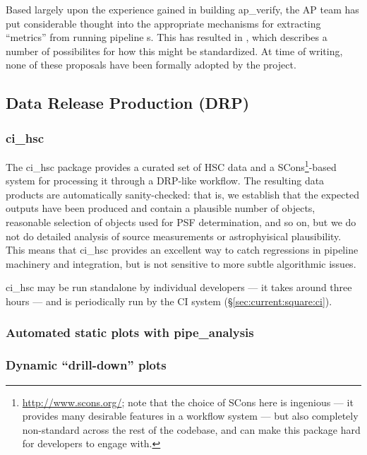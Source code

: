 \documentclass[DM,authoryear,toc,lsstdraft]{lsstdoc}
\begin{document}
Based largely upon the experience gained in building ap\_verify, the AP team
has put considerable thought into the appropriate mechanisms for extracting
``metrics'' from running pipeline s. This has resulted in
, which describes a number of possibilites for how this might
be standardized. At time of writing, none of these proposals have been
formally adopted by the project.

\subsection{Data Release Production (DRP)}
\label{sec:current:drp}

\subsubsection{ci\_hsc}
\label{sec:current:drp:cihsc}

The ci\_hsc package provides a curated set of HSC data and a
SCons\footnote{\url{http://www.scons.org/}; note that the choice of SCons here
is ingenious --- it provides many desirable features in a workflow system ---
but also completely non-standard across the rest of the codebase, and can make
this package hard for developers to engage with.}-based system for processing
it through a DRP-like workflow. The resulting data products are automatically
sanity-checked: that is, we establish that the expected outputs have been
produced and contain a plausible number of objects, reasonable selection of
objects used for PSF determination, and so on, but we do not do detailed
analysis of source measurements or astrophyisical plausibility. This means
that ci\_hsc provides an excellent way to catch regressions in pipeline
machinery and integration, but is not sensitive to more subtle algorithmic
issues.

ci\_hsc may be run standalone by individual developers --- it takes around
three hours --- and is periodically run by the CI system
(\S\ref{sec:current:square:ci}).

\subsubsection{Automated static plots with pipe\_analysis}
\label{sec:current:drp:pipeanalysis}

\subsubsection{Dynamic ``drill-down'' plots}
\label{sec:current:drp:drilldown}
\end{document}
